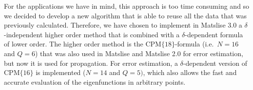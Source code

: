 For the applications we have in mind, this approach is too time consuming and so we decided to develop a new algorithm that is able to reuse all the data that was previously calculated.
Therefore, we have chosen to implement in Matslise 3.0 a $\delta$-independent higher order method that is combined with a $\delta$-dependent formula of lower order.
The higher order method is the $\text{CPM}\{18\}$-formula (i.e.\ $N=16$ and $Q=6$) %
that was also used in Matslise and Matslise 2.0 for error estimation, but now it is used for propagation.
For error estimation, a $\delta$-dependent version of $\text{CPM}\{16\}$ is implemented ($N=14$ and $Q=5)$, which also allows the fast and accurate evaluation of the eigenfunctions in arbitrary points.


%

%
%
%
% 
%
%
%
%
%


